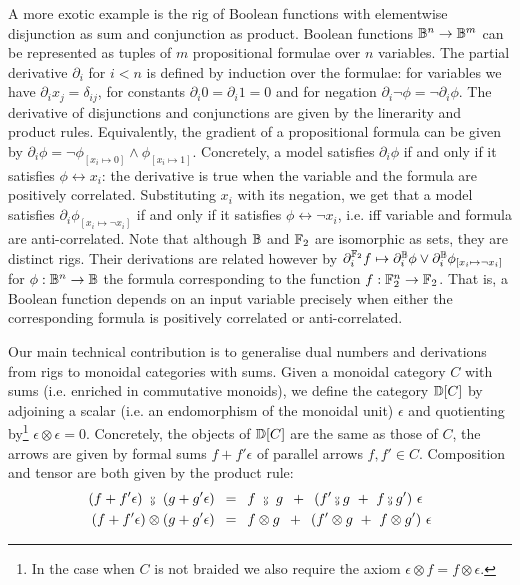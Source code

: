 A more exotic example is the rig of Boolean functions with elementwise disjunction as sum and conjunction as product.
Boolean functions $\mathbb{B}^n \to \mathbb{B}^m$ can be represented as tuples of $m$ propositional formulae over $n$ variables.
The partial derivative $\partial_i$ for $i < n$ is defined by induction over the formulae:
for variables we have $\partial_i x_j = \delta_{ij}$, for constants $\partial_i 0 = \partial_i 1 = 0$ and for negation $\partial_i \neg \phi = \neg \partial_i \phi$. The derivative of disjunctions and conjunctions are given by the linerarity and product rules.
Equivalently, the gradient of a propositional formula can be given by $\partial_i \phi = \neg \phi_{[x_i \mapsto 0]} \land \phi_{[x_i \mapsto 1]}$.
Concretely, a model satisfies $\partial_i \phi$ if and only if it satisfies $\phi \leftrightarrow x_i$: the derivative is true when the variable and the formula are positively correlated.
Substituting $x_i$ with its negation, we get that a model satisfies $\partial_i \phi_{[x_i \mapsto \neg x_i]}$ if and only if it satisfies $\phi \leftrightarrow \neg x_i$, i.e. iff variable and formula are anti-correlated.
Note that although $\mathbb{B}$ and $\mathbb{F}_2$ are isomorphic as sets, they are distinct rigs.
Their derivations are related however by $\partial^{\mathbb{F}_2}_i f \mapsto \partial^{\mathbb{B}}_i \phi \lor \partial^{\mathbb{B}}_i \phi_{[x_i \mapsto \neg x_i]}$ for $\phi : \mathbb{B}^n \to \mathbb{B}$ the formula corresponding to the function $f : \mathbb{F}_2^n \to \mathbb{F}_2$.
That is, a Boolean function depends on an input variable precisely when either the corresponding formula is positively correlated or anti-correlated.

Our main technical contribution is to generalise dual numbers and derivations from rigs to monoidal categories with sums.
Given a monoidal category $C$ with sums (i.e. enriched in commutative monoids), we define the category $\mathbb{D}[C]$ by adjoining a scalar (i.e. an endomorphism of the monoidal unit) $\epsilon$ and quotienting by\footnote{
In the case when $C$ is not braided we also require the axiom $\epsilon \otimes f = f \otimes \epsilon$.
} $\epsilon \otimes \epsilon = 0$.
Concretely, the objects of $\mathbb{D}[C]$ are the same as those of $C$, the arrows
are given by formal sums $f + f' \epsilon$ of parallel arrows $f, f' \in C$.
Composition and tensor are both given by the product rule:
\begin{align}
    (f + f' \epsilon) \ \fcmp \ (g + g' \epsilon)
    &\s = \s f \ \fcmp \ g \s + \s (f' \fcmp g \ + \ f \fcmp g') \ \epsilon\\
    (f + f' \epsilon) \otimes (g + g' \epsilon)
    &\s = \s f \otimes g \s + \s (f' \otimes g \ + \ f \otimes g') \ \epsilon
\end{align}

